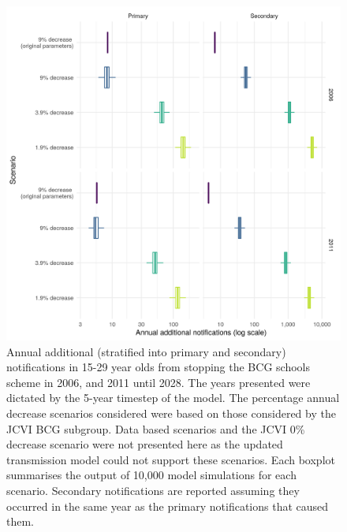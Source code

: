 \documentclass[11pt,twoside]{bristolthesis}
\begin{document}
  \newpage
  \begin{figure}
  
  {\centering \includegraphics[width=0.8\linewidth,]{chapters/evidence-policy-change/fig-3} 
  
  }
  
  \caption[Annual additional (stratified into primary and secondary) notifications in 15-29 year olds from stopping the BCG schools scheme in 2006, and 2011 until 2028.]{Annual additional (stratified into primary and secondary) notifications in 15-29 year olds from stopping the BCG schools scheme in 2006, and 2011 until 2028. The years presented were dictated by the 5-year timestep of the model. The percentage annual decrease scenarios considered were based on those considered by the JCVI BCG subgroup. Data based scenarios and the JCVI 0\% decrease scenario were not presented here as the updated transmission model could not support these scenarios. Each boxplot summarises the output of 10,000 model simulations for each scenario. Secondary notifications are reported assuming they occurred in the same year as the primary notifications that caused them.}\label{fig:graph-avg-add-not}
  \end{figure}
\end{document}
